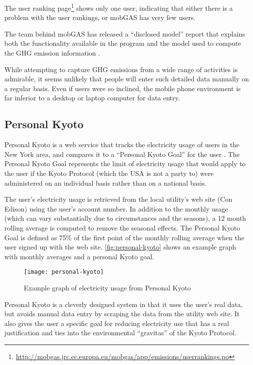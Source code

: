 The user ranking page\footnote{\url{http://mobgas.jrc.ec.europa.eu/mobgas/app/emissions/userrankings.po}} shows only one user, indicating that either there is a problem with the user rankings, or mobGAS has very few users.

The team behind mobGAS has released a ``disclosed model'' report that explains both the functionality available in the program and the model used to compute the GHG emission information \cite{Sousa-Pedrosa2008mobGAS-model}.

While attempting to capture GHG emissions from a wide range of activities is admirable, it seems unlikely that people will enter such detailed data manually on a regular basis. Even if users were so inclined, the mobile phone environment is far inferior to a desktop or laptop computer for data entry.

\subsection{Personal Kyoto}
\label{sec:personal-kyoto}

Personal Kyoto is a web service that tracks the electricity usage of users in the New York area, and compares it to a ``Personal Kyoto Goal'' for the user \cite{Personal-Kyoto-website}. The Personal Kyoto Goal represents the limit of electricity usage that would apply to the user if the Kyoto Protocol (which the USA is not a party to) were administered on an individual basis rather than on a national basis.

The user's electricity usage is retrieved from the local utility's web site (Con Edison) using the user's account number. In addition to the monthly usage (which can vary substantially due to circumstances and the seasons), a 12 month rolling average is computed to remove the seasonal effects. The Personal Kyoto Goal is defined as 75\% of the first point of the monthly rolling average when the user signed up with the web site. \autoref{fig:personal-kyoto} shows an example graph with monthly averages and a personal Kyoto goal.

\begin{figure}[htbp]
	\centering
		\texttt{[image: personal-kyoto]}
		\caption{Example graph of electricity usage from Personal Kyoto}
		\label{fig:personal-kyoto}
\end{figure}

Personal Kyoto is a cleverly designed system in that it uses the user's real data, but avoids manual data entry by scraping the data from the utility web site. It also gives the user a specific goal for reducing electricity use that has a real justification and ties into the environmental ``gravitas'' of the Kyoto Protocol.

